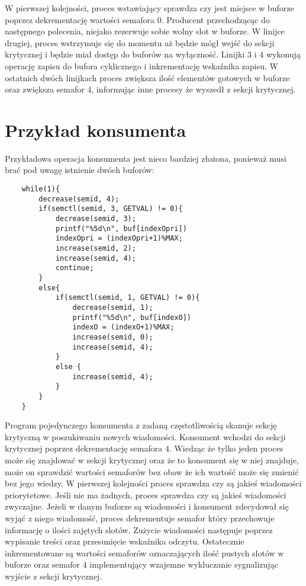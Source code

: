 \documentclass{mwrep}
\begin{document}
W pierwszej kolejności, proces wstawiający sprawdza czy jest miejsce w buforze
poprzez dekrementację wartości semafora $0$. Producent przechodzącąc do następnego
polecenia, niejako rezerwuje sobie wolny slot w buforze. W linijce drugiej, proces wstrzymuje się
do momentu aż będzie mógł wejść do sekcji krytycznej i będzie miał dostęp do buforów na wyłączność.
Linijki 3 i 4 wykonują operację zapisu do bufora cyklicznego i inkrementację wskaźnika zapisu.
W ostatnich dwóch linijkach proces zwiększa ilość elementów gotowych w buforze oraz zwiększa semafor $4$,
informując inne procesy że wyszedł z sekcji krytycznej.


\section{Przykład konsumenta}
\label{konsument}
\indent Przykładowa operacja konsumenta jest nieco bardziej złożona, ponieważ musi brać pod
uwagę istnienie dwóch buforów:

\begin{verbatim}
    while(1){
        decrease(semid, 4); 
        if(semctl(semid, 3, GETVAL) != 0){
            decrease(semid, 3);
            printf("%5d\n", buf[indexOpri])
            indexOpri = (indexOpri+1)%MAX;
            increase(semid, 2);
            increase(semid, 4);
            continue;
        }
        else{
            if(semctl(semid, 1, GETVAL) != 0){
                decrease(semid, 1);
                printf("%5d\n", buf[indexO])
                indexO = (indexO+1)%MAX;
                increase(semid, 0);
                increase(semid, 4);
            }
            else {
                increase(semid, 4);
            }
        }
    }

\end{verbatim}

\indent Program pojedynczego konsumenta z zadaną częstotliwością skanuje sekcję krytyczną
w poszukiwaniu nowych wiadomości. Konsument wchodzi do sekcji krytycznej poprzez dekrementację semafora $4$.
Wiedząc że tylko jeden proces może się znajdować w sekcji krytycznej oraz że to konsument się w niej znajduje,
może on sprawdzić wartości semaforów bez obaw że ich wartość może się zmienić bez jego wiedzy.
W pierwszej kolejności proces sprawdza czy są jakieś wiadomości priorytetowe. Jeśli nie ma żadnych,
proces sprawdza czy są jakieś wiadomości zwyczajne. Jeżeli w danym buforze są wiadomości i konsument zdecydował
się wyjąć z niego wiadomość, proces dekrementuje semafor który przechowuje informację o ilości zajętych slotów.
Zużycie wiadomości następuje poprzez wypisanie treści oraz przesunięcie wskaźnika odczytu. Ostatecznie
inkrementowane są wartości semaforów oznaczających ilość pustych slotów w buforze oraz semafor $4$
implementujący wzajemne wykluczanie sygnalizując wyjście z sekcji krytycznej.
\end{document}
